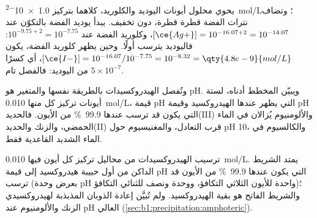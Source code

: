 \begin{example}\label{ex:b1:precipitation:i-cl}
يحوي محلول أيونات اليوديد والكلوريد، كلاهما بتركيز
\qty{1.0e-2}{mol/L}؛ وتضاف نترات الفضة قطرة قطرة، دون
تخفيف. يبدأ يوديد الفضة بالتكوّن عند $[\ce{Ag+}] = 10^{-16.07 + 2} =
10^{-14.07}$، وكلوريد الفضة عند $10^{-9.75 + 2} = 10^{-7.75}$: فاليوديد
يترسب أولًا. وحين يظهر كلوريد الفضة، يكون
$[\ce{I-}] = 10^{-16.07}/10^{-7.75} = 10^{-8.32} = \qty{4.8e-9}{mol/L}$،
أي كسرًا $5 \times 10^{-7}$ من اليوديد: فالفصل تام.
\end{example}

وتُفصل الهيدروكسيدات بالطريقة نفسها والمتغير هو pH.
ويبيّن المخطط أدناه، لستة أيونات تركيز كل منها
\qty{0.010}{mol/L}، قيمة pH التي يظهر عندها الهيدروكسيد وقيمة pH التي يكون
قد ترسب عندها \qty{99.9}{\percent} من الأيون. فالحديد(III) والألومنيوم
يُزالان في الماء الحمضي، والزنك والحديد(II) قرب التعادل، والمغنيسيوم
حول pH 10، والكالسيوم في الماء الشديد القاعدية فقط.

\begin{omfigure}

{\small ترسيب الهيدروكسيدات من محاليل تركيز كل
أيون فيها \qty{0.010}{mol/L}. يمتد الشريط الداكن من أول حبيبة هيدروكسيد إلى قيمة pH
التي يكون عندها \qty{99.9}{\percent} من الأيون قد ترسب (بعرض وحدة pH واحدة
للأيون الثلاثي التكافؤ، ووحدة ونصف للثنائي التكافؤ)؛ والشريط الفاتح هو
بقية  الهيدروكسيد. ولم تُبيَّن إعادة الذوبان
المذبذبة لهيدروكسيدي الزنك والألومنيوم عند pH العالي
(\cref{sec:b1:precipitation:amphoteric}).}
\end{omfigure}

